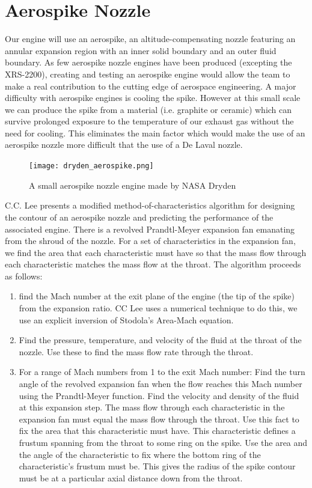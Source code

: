 \documentclass{article}
\begin{document}
\section*{Aerospike Nozzle}
Our engine will use an aerospike, an altitude-compensating nozzle featuring an annular expansion region with an inner solid boundary and an outer fluid boundary. As few aerospike nozzle engines have been produced (excepting the XRS-2200), creating and testing an aerospike engine would allow the team to make a real contribution to the cutting edge of aerospace engineering. A major difficulty with aerospike engines is cooling the spike. However at this small scale we can produce the spike from a material (i.e. graphite or ceramic) which can survive prolonged exposure to the temperature of our exhaust gas without the need for cooling. This eliminates the main factor which would make the use of an aerospike nozzle more difficult that the use of a De Laval nozzle.\\
\begin{figure}[h!]
\centering
\texttt{[image: dryden\_aerospike.png]}
\caption{A small aerospike nozzle engine made by NASA Dryden} 
\label{dryden_aerospike}
\end{figure}
C.C. Lee \cite{CCLee} presents a modified method-of-characteristics algorithm for designing the contour of an aerospike nozzle and predicting the performance of the associated engine. There is a revolved Prandtl-Meyer expansion fan emanating from the shroud of the nozzle. For a set of characteristics in the expansion fan, we find the area that each characteristic must have so that the mass flow through each characteristic matches the mass flow at the throat. The algorithm proceeds as follows:
\begin{enumerate}
\item find the Mach number at the exit plane of the engine (the tip of the spike) from the expansion ratio. CC Lee uses a numerical technique to do this, we use an explicit inversion of Stodola's Area-Mach equation.
\item Find the pressure, temperature, and velocity of the fluid at the throat of the nozzle. Use these to find the mass flow rate through the throat.
\item For a range of Mach numbers from 1 to the exit Mach number:
\subitem Find the turn angle of the revolved expansion fan when the flow reaches this Mach number using the Prandtl-Meyer function.
\subitem Find the velocity and density of the fluid at this expansion step.
\subitem The mass flow through each characteristic in the expansion fan must equal the mass flow through the throat. Use this fact to fix the area that this characteristic must have. 
\subitem This characteristic defines a frustum spanning from the throat to some ring on the spike. Use the area and the angle of the characteristic to fix where the bottom ring of the characteristic's frustum must be. This gives the radius of the spike contour must be at a particular axial distance down from the throat.
\end{enumerate} 
\end{document}

